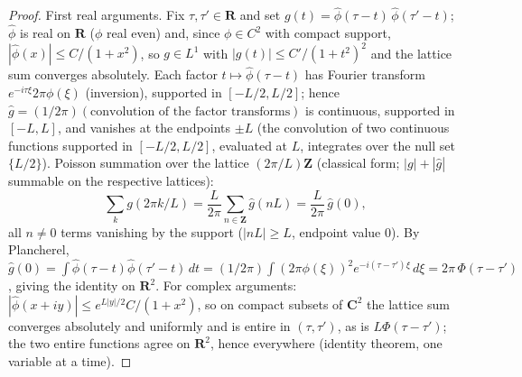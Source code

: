 \documentclass[11pt]{article}
\theoremstyle{plain}
\theoremstyle{definition}
\theoremstyle{remark}
\newcommand{\Z}{\mathbf{Z}}
\newcommand{\R}{\mathbf{R}}
\newcommand{\Cx}{\mathbf{C}}
\newcommand{\ph}{\widehat{\phi}}
\begin{document}
\begin{proof}
First real arguments. Fix $\tau, \tau' \in \R$ and set
$g(t) = \ph(\tau - t)\, \ph(\tau' - t)$; $\ph$ is real on $\R$ ($\phi$ real even)
and, since $\phi \in C^2$ with compact support,
$|\ph(x)| \le C/(1 + x^2)$, so $g \in L^1$ with
$|g(t)| \le C'/(1 + t^2)^2$ and the lattice sum converges absolutely. Each factor
$t \mapsto \ph(\tau - t)$ has Fourier transform
$e^{-i\tau\xi} 2\pi \phi(\xi)$ (inversion), supported in $[-L/2, L/2]$; hence
$\widehat{g} = (1/2\pi)(\text{convolution of the factor transforms})$ is
continuous, supported in $[-L, L]$, and vanishes at the endpoints $\pm L$ (the
convolution of two continuous functions supported in $[-L/2, L/2]$, evaluated at
$L$, integrates over the null set $\{L/2\}$). Poisson summation over the lattice
$(2\pi/L)\Z$ (classical form; $|g| + |\widehat{g}|$ summable on the respective
lattices):
\[
  \sum_k g(2\pi k/L)
  = \frac{L}{2\pi} \sum_{n \in \Z} \widehat{g}(nL)
  = \frac{L}{2\pi}\, \widehat{g}(0),
\]
all $n \ne 0$ terms vanishing by the support ($|nL| \ge L$, endpoint value $0$).
By Plancherel,
$\widehat{g}(0) = \int \ph(\tau - t) \ph(\tau' - t)\, dt
 = (1/2\pi) \int (2\pi\phi(\xi))^2 e^{-i(\tau - \tau')\xi}\, d\xi
 = 2\pi\, \Phi(\tau - \tau')$,
giving the identity on $\R^2$. For complex arguments:
$|\ph(x + iy)| \le e^{L|y|/2} C/(1 + x^2)$, so on compact subsets of $\Cx^2$ the
lattice sum converges absolutely and uniformly and is entire in $(\tau, \tau')$,
as is $L\Phi(\tau - \tau')$; the two entire functions agree on $\R^2$, hence
everywhere (identity theorem, one variable at a time).
\end{proof}
\end{document}
